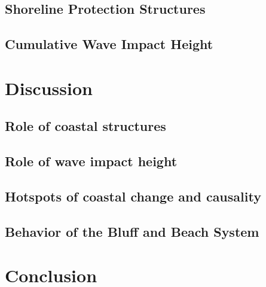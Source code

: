\subsection{Shoreline Protection Structures}
\label{Shoreline Protection Structures}

\subsection{Cumulative Wave Impact Height}
\label{Cumulative Wave Impact Height}

\section{Discussion}
\label{Discussion}

\subsection{Role of coastal structures}
\label{Role of coastal structures}

\subsection{Role of wave impact height}
\label{Role of wave impact height}

\subsection{Hotspots of coastal change and causality}
\label{Hotspots of coastal change and causality}

\subsection{Behavior of the Bluff and Beach System}
\label{Behavior of the Bluff and Beach System}

\section{Conclusion}
\label{Conclusion}